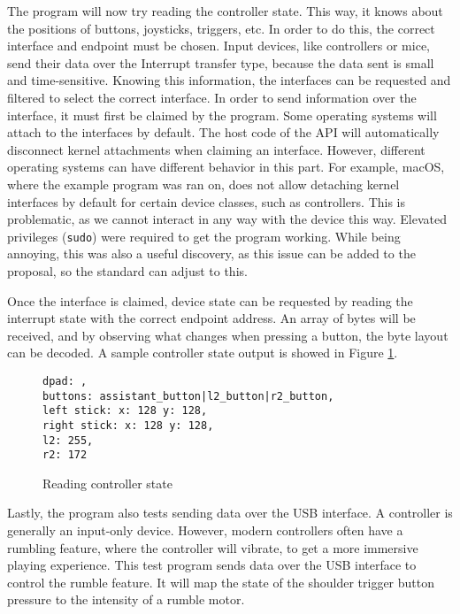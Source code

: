 The program will now try reading the controller state. This way, it knows about the positions of buttons, joysticks, triggers, etc. In order to do this, the correct interface and endpoint must be chosen. Input devices, like controllers or mice, send their data over the Interrupt transfer type, because the data sent is small and time-sensitive. Knowing this information, the interfaces can be requested and filtered to select the correct interface. In order to send information over the interface, it must first be claimed by the program. Some operating systems will attach to the interfaces by default. The host code of the API will automatically disconnect kernel attachments when claiming an interface. However, different operating systems can have different behavior in this part. For example, macOS, where the example program was ran on, does not allow detaching kernel interfaces by default for certain device classes, such as controllers. This is problematic, as we cannot interact in any way with the device this way. Elevated privileges (\texttt{sudo}) were required to get the program working. While being annoying, this was also a useful discovery, as this issue can be added to the proposal, so the standard can adjust to this.

Once the interface is claimed, device state can be requested by reading the interrupt state with the correct endpoint address. An array of bytes will be received, and by observing what changes when pressing a button, the byte layout can be decoded. A sample controller state output is showed in Figure \ref{fig:wasi_controller_sample_output}.

\begin{figure}[h]
\begin{verbatim}
dpad: ,
buttons: assistant_button|l2_button|r2_button,
left stick: x: 128 y: 128,
right stick: x: 128 y: 128,
l2: 255,
r2: 172
\end{verbatim}
\caption{Reading controller state}
\label{fig:wasi_controller_sample_output}
\end{figure}

Lastly, the program also tests sending data over the USB interface. A controller is generally an input-only device. However, modern controllers often have a rumbling feature, where the controller will vibrate, to get a more immersive playing experience. This test program sends data over the USB interface to control the rumble feature. It will map the state of the shoulder trigger button pressure to the intensity of a rumble motor.


